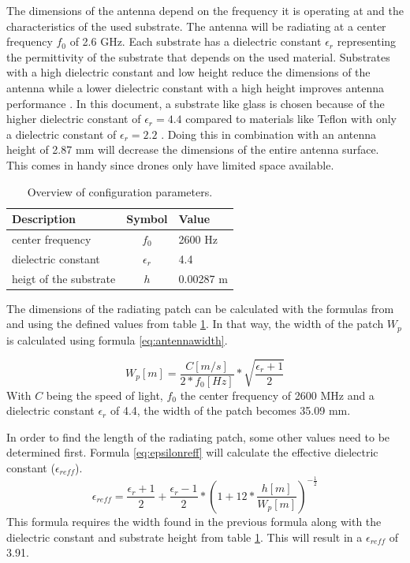 The dimensions of the antenna depend on the frequency it is operating at and the characteristics of the used substrate.
The antenna will be radiating at a center frequency $f_0$ of 2.6 GHz. Each substrate has a \gls{dielectric constant} $\epsilon_r$ representing 
the permittivity of the substrate that depends on the used material.
Substrates with a high \gls{dielectric constant} and low height 
reduce the dimensions of the antenna
while a lower \gls{dielectric constant} with a high height improves antenna performance \cite{J14_antennadesign,J15_antennadesign}. 
In this document, a substrate like glass 
is chosen because of the higher \gls{dielectric constant} of $\epsilon_r = 4.4$ compared to materials like Teflon with only a dielectric 
constant of $\epsilon_r = 2.2$ \cite{J14_antennadesign}. 
Doing this in combination with an antenna height of 2.87 mm will decrease the dimensions of the entire antenna surface.
This comes in handy since drones only have limited space available.

\begin{table}[h!]
\centering
\begin{tabular}{|l|c|l|}
\hline
 Description            & Symbol          & Value         \\    \hline
 center frequency       & $f_0$           & 2600 Hz       \\ 
 \gls{dielectric constant}    & $\epsilon_r$    & 4.4         \\ 
 heigt of the substrate & $h$             & 0.00287 m    \\ \hline
\end{tabular}
\caption{Overview of configuration parameters.}
\label{table:antennaparas}
\end{table}

The dimensions of the radiating patch can be calculated with the formulas from \cite{J14_antennadesign} and \cite{J15_antennadesign}
using the defined values from table \ref{table:antennaparas}. In that way, the width of the patch $W_{p}$ is calculated using formula \ref{eq:antennawidth}.

\begin{equation} 
W_{p} [m] = \frac{C [m/s]}{2*f_0 [Hz]}*\sqrt{\frac{\epsilon_r+1}{2}}
\label{eq:antennawidth}
\end{equation}
With $C$ being the speed of light, $f_0$ the center frequency of 2600 MHz and a \gls{dielectric constant} $\epsilon_r$ of 4.4, the width of the patch becomes 35.09 mm.

In order to find the length of the radiating patch, some other values need to be determined first. Formula \ref{eq:epsilonreff} will
calculate the effective \gls{dielectric constant} ($\epsilon_{reff}$).
\begin{equation} 
\epsilon_{reff} = \frac{\epsilon_r+1}{2}+  \frac{\epsilon_r-1}{2} * \left(1+12*\frac{h [m]}{W_{p} [m] }\right)^{-\frac{1}{2}}
\label{eq:epsilonreff}
\end{equation}
This formula requires the width found in the previous formula along with the \gls{dielectric constant} and substrate height from table \ref{table:antennaparas}.
This will result in a $\epsilon_{reff}$ of 3.91.

